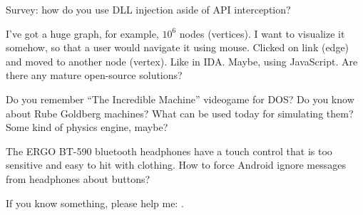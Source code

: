 Survey: how do you use DLL injection aside of API interception?

\myhrule{}

I've got a huge graph, for example, $10^6$ nodes (vertices).
I want to visualize it somehow, so that a user would navigate it using mouse.
Clicked on link (edge) and moved to another node (vertex).
Like in IDA.
Maybe, using JavaScript.
Are there any mature open-source solutions?

\myhrule{}

Do you remember ``The Incredible Machine'' videogame for DOS?
Do you know about Rube Goldberg machines?
What can be used today for simulating them?
Some kind of physics engine, maybe?

\myhrule{}

The ERGO BT-590 bluetooth headphones have a touch control that is too sensitive and easy to hit with clothing.
How to force Android ignore messages from headphones about buttons?

\myhrule{}

If you know something, please help me: \EMAILS{}.


